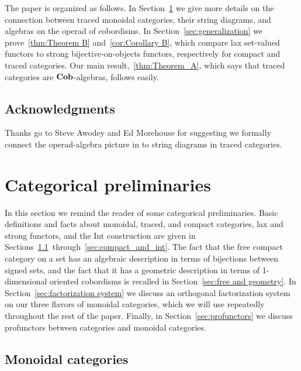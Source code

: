 \documentclass[12pt,oneside,article,draft]{memoir}
\begin{document}
The paper is organized as follows.  In Section~\ref{sec:traced categories} we give more details on
the connection between traced monoidal categories, their string diagrams, and algebras on the operad
of cobordisms.  In Section~\ref{sec:generalization} we prove~\ref{thm:Theorem B}
and~\ref{cor:Corollary B}, which compare lax set-valued functors to strong bijective-on-objects
functors, respectively for compact and traced categories.  Our main result,~\ref{thm:Theorem_A},
which says that traced categories are $\mathbf{Cob}$-algebras, follows easily.

\section*{Acknowledgments}

Thanks go to Steve Awodey and Ed Morehouse for suggesting we formally connect the operad-algebra
picture in \cite{RupelSpivak} to string diagrams in traced categories.

\chapter{Categorical preliminaries}\label{sec:traced categories}

In this section we remind the reader of some categorical preliminaries.  Basic definitions and facts
about monoidal, traced, and compact categories, lax and strong functors, and the Int construction
are given in Sections~\ref{sec:prelim monoidal}~through~\ref{sec:compact_and_int}.  The fact that
the free compact category on a set has an algebraic description in terms of bijections between
signed sets, and the fact that it has a geometric description in terms of 1-dimensional oriented
cobordisms is recalled in Section~\ref{sec:free and geometry}.  In Section~\ref{sec:factorization
system} we discuss an orthogonal factorization system on our three flavors of monoidal categories,
which we will use repeatedly throughout the rest of the paper.  Finally, in
Section~\ref{sec:profunctors} we discuss profunctors between categories and monoidal categories.


\section{Monoidal categories}\label{sec:prelim monoidal}
\end{document}

